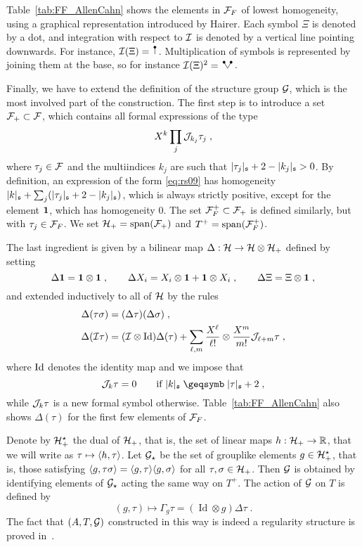 \documentclass[reqno,11pt]{article}
\def\unit{\vone}
\DeclareMathOperator{\vspan}{span}
\DeclareMathOperator{\Id}{Id}
\def\abss#1{\abs{#1}_\mathfrak{s}}
\begin{document}
Table~\ref{tab:FF_AllenCahn} shows the elements in ${\mathcal F}_F$ of lowest
homogeneity, using a graphical representation introduced by Hairer. Each symbol 
$\Xi$ is denoted by a dot, and integration with respect to ${\mathcal I}$ is denoted by
a vertical line pointing downwards. For instance, $\cI(\Xi)=\RSI$.
Multiplication of symbols is represented by joining them at the base, so for
instance $\cI(\Xi)^2 = \RSV$.

Finally, we have to extend the definition of the structure group ${\mathcal G}$, which is
the most involved part of the construction. The first step is to introduce a
set ${\mathcal F}_+ \subset {\mathcal F}$, which contains all formal expressions of the type 
\begin{equation}
 \label{eq:rs09}
 X^k \prod_{j} \cJ_{k_j}\tau_j\;,
\end{equation}
where $\tau_j\in{\mathcal F}$ and the multiindices $k_j$ are such that
$\abss{\tau_j}+2-\abss{k_j}>0$. By definition, an expression of the form
\eqref{eq:rs09} has homogeneity $\abss{k} + \sum_j(\abss{\tau_j}+2-\abss{k_j})$,
which is always strictly positive, except for the element $\unit$, which has
homogeneity $0$. The set ${\mathcal F}_F^+\subset{\mathcal F}_+$ is defined similarly, but with
$\tau_j\in{\mathcal F}_F$. We set $\cH_+=\vspan(\cF_+)$ and $T^+=\vspan(\cF_F^+)$. 

The last ingredient is given by a bilinear map %
$\Delta:{\mathcal H}\to{\mathcal H}\otimes{\mathcal H}_+$ defined by setting 
\begin{equation}
 \label{eq:rs10}
 \Delta\unit = \unit\otimes\unit\;, \qquad 
 \Delta X_i = X_i\otimes\unit + \unit\otimes X_i\;, \qquad 
 \Delta\Xi = \Xi\otimes\unit\;,
\end{equation} 
and extended inductively to all of ${\mathcal H}$ by the rules 
\begin{align}
\nonumber
\Delta(\tau\sigma) &= (\Delta\tau)(\Delta\sigma)\;, \\
\Delta(\cI\tau) &= (\cI\otimes \Id)\Delta(\tau) 
+ \sum_{\ell, m} \frac{X^\ell}{\ell!} \otimes \frac{X^m}{m!} \cJ_{\ell+m}\tau\;,
\label{eq:rs11} 
\end{align}
where $\textnormal{Id}$ denotes the identity map and we impose that 
\begin{equation}
\label{eq:Jiszero}
\cJ_k\tau=0\qquad \text{if $\abss{k}\geqs \abss{\tau}+2$\;,}
\end{equation}
while ${\mathcal J}_k\tau$ is a new formal symbol otherwise. Table~\ref{tab:FF_AllenCahn}
also shows $\Delta(\tau)$ for the first few elements of ${\mathcal F}_F$. 

Denote by ${\mathcal H}_+^\star$ the dual of ${\mathcal H}_+$, that is, the set of linear maps
$h:{\mathcal H}_+\to\mathbb{R}$, that we will write as $\tau\mapsto\langle h,\tau\rangle$. Let
${\mathcal G}_\star$ be the set of grouplike elements $g\in{\mathcal H}_+^\star$, that is, those
satisfying $\langle g,\tau\sigma\rangle = \langle g,\tau\rangle \langle g,\sigma\rangle$ for all
$\tau,\sigma\in{\mathcal H}_+$. Then ${\mathcal G}$ is obtained by identifying elements of
${\mathcal G}_\star$ acting the same way on $T^+$. The action of ${\mathcal G}$ on $T$ is defined
by 
\begin{equation}
\label{eq:def_g} 
 (g,\tau) \mapsto \Gamma_g\tau = (\Id\otimes g)\Delta\tau\;.
\end{equation}
The fact that $(A,T,{\mathcal G})$ constructed in this way is indeed a regularity
structure is proved in~\cite[Thm.~8.24]{Hairer2014}. 
\end{document}

